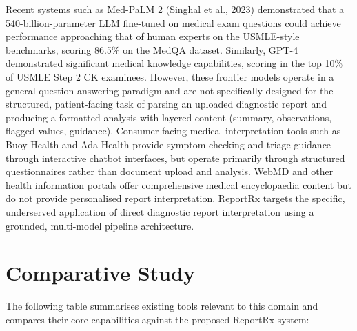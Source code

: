 \documentclass[12pt,a4paper]{report}
\begin{document}
Recent systems such as Med-PaLM 2 (Singhal et al., 2023) demonstrated that a 540-billion-parameter LLM fine-tuned on medical exam questions could achieve performance approaching that of human experts on the USMLE-style benchmarks, scoring 86.5\% on the MedQA dataset. Similarly, GPT-4 demonstrated significant medical knowledge capabilities, scoring in the top 10\% of USMLE Step 2 CK examinees. However, these frontier models operate in a general question-answering paradigm and are not specifically designed for the structured, patient-facing task of parsing an uploaded diagnostic report and producing a formatted analysis with layered content (summary, observations, flagged values, guidance). Consumer-facing medical interpretation tools such as Buoy Health and Ada Health provide symptom-checking and triage guidance through interactive chatbot interfaces, but operate primarily through structured questionnaires rather than document upload and analysis. WebMD and other health information portals offer comprehensive medical encyclopaedia content but do not provide personalised report interpretation. ReportRx targets the specific, underserved application of direct diagnostic report interpretation using a grounded, multi-model pipeline architecture.

\section{Comparative Study}
The following table summarises existing tools relevant to this domain and compares their core capabilities against the proposed ReportRx system:
\end{document}
